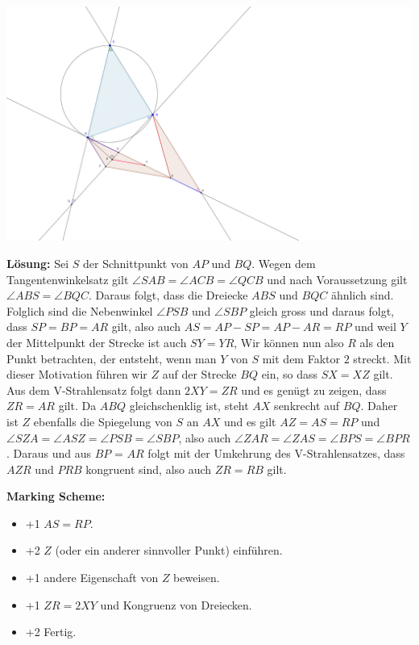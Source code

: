 \documentclass[language=german,style=solution]{smo}
\begin{document}
\begin{enumerate}[label=\textbf{\arabic*.}]
\includegraphics[width=\textwidth]{finalrunde_5_2017.png}

\textbf{Lösung:} Sei $S$ der Schnittpunkt von $AP$ und $BQ$. Wegen dem Tangentenwinkelsatz gilt $\angle SAB = \angle ACB = \angle QCB$ und nach Voraussetzung gilt $\angle ABS = \angle BQC$. Daraus folgt, dass die Dreiecke $ABS$ und $BQC$ ähnlich sind. Folglich sind die Nebenwinkel $ \angle PSB$ und $\angle SBP$ gleich gross und daraus folgt, dass $SP = BP = AR$ gilt, also auch $AS = AP - SP = AP - AR = RP$ und weil $Y$ der Mittelpunkt der Strecke ist auch $SY = YR$, Wir können nun also  $R$ als den Punkt betrachten, der entsteht, wenn man $Y$ von $S$ mit dem Faktor $2$ streckt. Mit dieser Motivation führen wir $Z$ auf der Strecke $BQ$ ein, so dass $SX = XZ$ gilt. Aus dem V-Strahlensatz folgt dann $2XY = ZR$ und es genügt zu zeigen, dass $ZR = AR$ gilt.
Da $ABQ$ gleichschenklig ist, steht $AX$ senkrecht auf $BQ$. Daher ist $Z$ ebenfalls die Spiegelung von $S$ an $AX$ und es gilt $AZ = AS = RP$ und $ \angle SZA = \angle ASZ = \angle PSB = \angle SBP$, also auch $\angle ZAR = \angle ZAS = \angle BPS = \angle BPR$. Daraus und aus $BP$ = $AR$ folgt mit der Umkehrung des V-Strahlensatzes, dass $AZR$ und $PRB$ kongruent sind, also auch $ZR = RB$ gilt.

\textbf{Marking Scheme:} 
\begin{itemize}
	\item +1 $AS = RP$.
	\item +2 $Z$ (oder ein anderer sinnvoller Punkt) einführen.
	\item +1 andere Eigenschaft von $Z$ beweisen.
	\item +1 $ZR = 2XY$ und Kongruenz von Dreiecken.
	\item +2 Fertig.
\end{itemize}


\end{enumerate}
\end{document}
